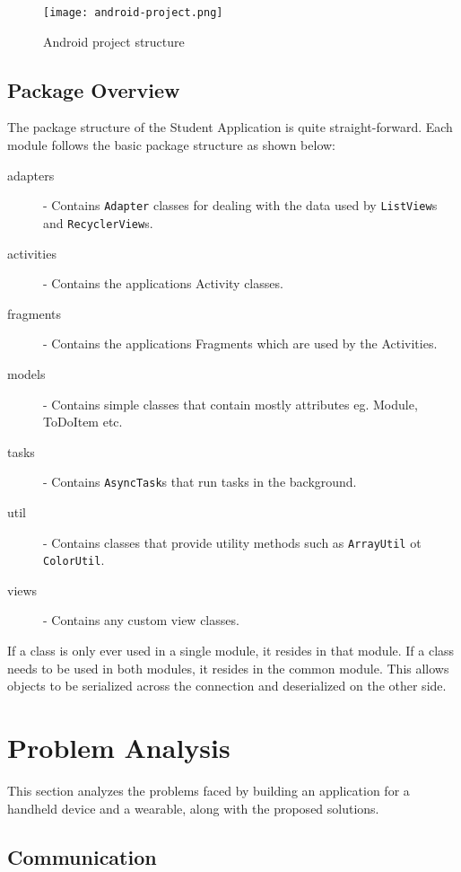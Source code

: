 \begin{figure}
    \centering
    \texttt{[image: android-project.png]}
    \caption{Android project structure}
    \label{fig:android_project}
\end{figure}

\subsection{Package Overview}

The package structure of the Student Application is quite straight-forward. Each
module follows the basic package structure as shown below:

\begin{description}
\item[adapters] - Contains \texttt{Adapter} classes for dealing with the data
    used by \texttt{ListView}s and \texttt{RecyclerView}s.
\item[activities] - Contains the applications Activity classes.
\item[fragments] - Contains the applications Fragments which are used by the
    Activities.
\item[models] - Contains simple classes that contain mostly attributes eg.
    Module, ToDoItem etc.
\item[tasks] - Contains \texttt{AsyncTask}s that run tasks in the background.
\item[util] - Contains classes that provide utility methods such as
    \texttt{ArrayUtil} ot \texttt{ColorUtil}.
\item[views] - Contains any custom view classes.
\end{description}

If a class is only ever used in a single module, it resides in that module. If
a class needs to be used in both modules, it resides in the common module. This
allows objects to be serialized across the connection and deserialized on the
other side.

\section{Problem Analysis}

This section analyzes the problems faced by building an application for a
handheld device and a wearable, along with the proposed solutions.

\subsection{Communication}

